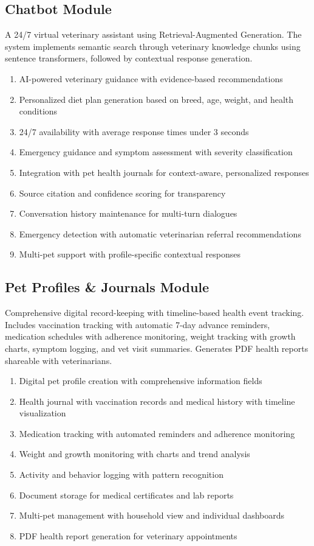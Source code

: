\subsection{Chatbot Module}
A 24/7 virtual veterinary assistant using Retrieval-Augmented Generation. The system implements semantic search through veterinary knowledge chunks using sentence transformers, followed by contextual response generation.
\begin{enumerate}
    \item AI-powered veterinary guidance with evidence-based recommendations
    \item Personalized diet plan generation based on breed, age, weight, and health conditions
    \item 24/7 availability with average response times under 3 seconds
    \item Emergency guidance and symptom assessment with severity classification
    \item Integration with pet health journals for context-aware, personalized responses
    \item Source citation and confidence scoring for transparency
    \item Conversation history maintenance for multi-turn dialogues
    \item Emergency detection with automatic veterinarian referral recommendations
    \item Multi-pet support with profile-specific contextual responses
\end{enumerate}

\subsection{Pet Profiles \& Journals Module}
Comprehensive digital record-keeping with timeline-based health event tracking. Includes vaccination tracking with automatic 7-day advance reminders, medication schedules with adherence monitoring, weight tracking with growth charts, symptom logging, and vet visit summaries. Generates PDF health reports shareable with veterinarians.
\begin{enumerate}
    \item Digital pet profile creation with comprehensive information fields
    \item Health journal with vaccination records and medical history with timeline visualization
    \item Medication tracking with automated reminders and adherence monitoring
    \item Weight and growth monitoring with charts and trend analysis
    \item Activity and behavior logging with pattern recognition
    \item Document storage for medical certificates and lab reports
    \item Multi-pet management with household view and individual dashboards
    \item PDF health report generation for veterinary appointments
\end{enumerate}


